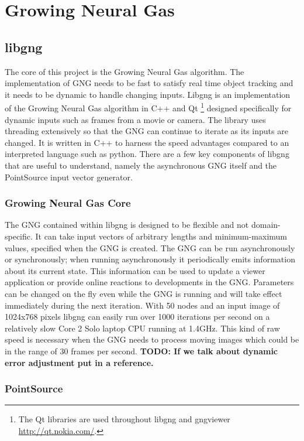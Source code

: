 \documentclass{article}
\renewcommand{\|}{\origbar} %
\begin{document}
\section{Growing Neural Gas}
\label{sec:GNG}

\subsection{libgng}

The core of this project is the Growing Neural Gas algorithm. The implementation of GNG needs to be fast to satisfy real time object tracking and it needs to be dynamic to handle changing inputs. Libgng is an implementation of the Growing Neural Gas algorithm in C++ and Qt \footnote{The Qt libraries are used throughout libgng and gngviewer \url{http://qt.nokia.com/}.} designed specifically for dynamic inputs such as frames from a movie or camera. The library uses threading extensively so that the GNG can continue to iterate as its inputs are changed. It is written in C++ to harness the speed advantages compared to an interpreted language such as python. There are a few key components of libgng that are useful to understand, namely the asynchronous GNG itself and the PointSource input vector generator.

\subsubsection{Growing Neural Gas Core}

The GNG contained within libgng is designed to be flexible and not domain-specific. It can take input vectors of arbitrary lengths and minimum-maximum values, specified when the GNG is created. The GNG can be run asynchronously or synchronously; when running asynchronously it periodically emits information about its current state. This information can be used to update a viewer application or provide online reactions to developments in the GNG. Parameters can be changed on the fly even while the GNG is running and will take effect immediately during the next iteration. With 50 nodes and an input image of 1024x768 pixels libgng can easily run over 1000 iterations per second on a relatively slow Core 2 Solo laptop CPU running at 1.4GHz. This kind of raw speed is necessary when the GNG needs to process moving images which could be in the range of 30 frames per second. {\bf TODO: If we talk about dynamic error adjustment put in a reference.}

\subsubsection{PointSource}
\end{document}
